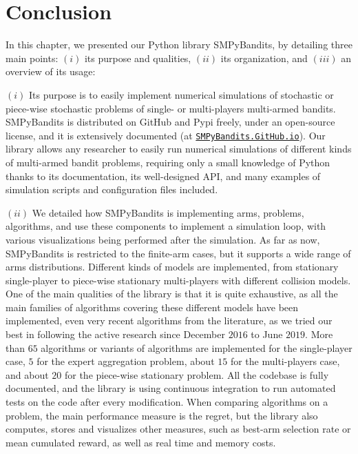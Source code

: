 \newpage  %
\newpage  %
\section{Conclusion}
\label{sec:3:conclusion}


In this chapter, we presented our Python library SMPyBandits, by detailing three main points:
$(i)$ its purpose and qualities,
$(ii)$ its organization,
and $(iii)$ an overview of its usage:
%

$(i)$
Its purpose is to easily implement numerical simulations of stochastic or piece-wise stochastic problems of single- or multi-players multi-armed bandits.
SMPyBandits is distributed on GitHub and Pypi freely, under an open-source license, and it is extensively documented (at \href{https://SMPyBandits.GitHub.io}{\texttt{SMPyBandits.GitHub.io}}).
Our library allows any researcher to easily run numerical simulations of different kinds of multi-armed bandit problems, requiring only a small knowledge of Python thanks to its documentation, its well-designed API, and many examples of simulation scripts and configuration files included.

$(ii)$
We detailed how SMPyBandits is implementing arms, problems, algorithms, and use these components to implement a simulation loop, with various visualizations being performed after the simulation.
As far as now, SMPyBandits is restricted to the finite-arm cases, but it supports a wide range of arms distributions.
Different kinds of models are implemented, from stationary single-player to piece-wise stationary multi-players with different collision models.
One of the main qualities of the library is that it is quite exhaustive, as all the main families of algorithms covering these different models have been implemented, even very recent algorithms from the literature, as we tried our best in following the active research since December $2016$ to June $2019$.
More than $65$ algorithms or variants of algorithms are implemented for the single-player case, $5$ for the expert aggregation problem, about $15$ for the multi-players case, and about $20$ for the piece-wise stationary problem.
All the codebase is fully documented, and the library is using continuous integration to run automated tests on the code after every modification.
%
When comparing algorithms on a problem, the main performance measure is the regret, but the library also computes, stores and visualizes other measures, such as best-arm selection rate or mean cumulated reward, as well as real time and memory costs.

